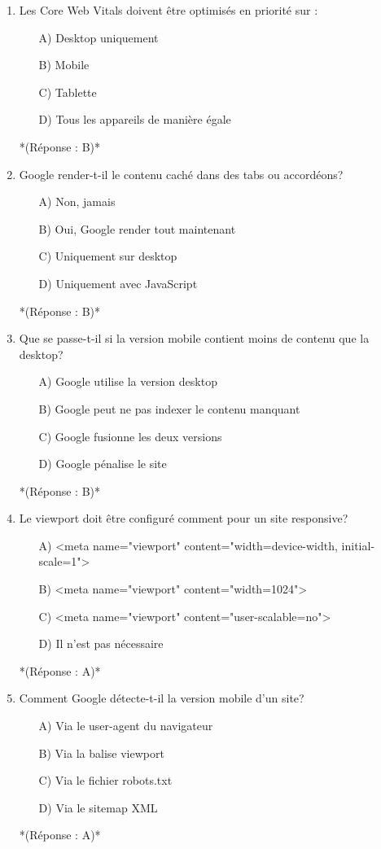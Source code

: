 \documentclass[12pt,a4paper,twoside]{report}
\begin{document}
\begin{enumerate}
\item Les Core Web Vitals doivent être optimisés en priorité sur :
\begin{itemize}
\item[A)] Desktop uniquement
\item[B)] Mobile
\item[C)] Tablette
\item[D)] Tous les appareils de manière égale
\end{itemize}
*(Réponse : B)*

\item Google render-t-il le contenu caché dans des tabs ou accordéons?
\begin{itemize}
\item[A)] Non, jamais
\item[B)] Oui, Google render tout maintenant
\item[C)] Uniquement sur desktop
\item[D)] Uniquement avec JavaScript
\end{itemize}
*(Réponse : B)*

\item Que se passe-t-il si la version mobile contient moins de contenu que la desktop?
\begin{itemize}
\item[A)] Google utilise la version desktop
\item[B)] Google peut ne pas indexer le contenu manquant
\item[C)] Google fusionne les deux versions
\item[D)] Google pénalise le site
\end{itemize}
*(Réponse : B)*

\item Le viewport doit être configuré comment pour un site responsive?
\begin{itemize}
\item[A)] <meta name="viewport" content="width=device-width, initial-scale=1">
\item[B)] <meta name="viewport" content="width=1024">
\item[C)] <meta name="viewport" content="user-scalable=no">
\item[D)] Il n'est pas nécessaire
\end{itemize}
*(Réponse : A)*

\item Comment Google détecte-t-il la version mobile d'un site?
\begin{itemize}
\item[A)] Via le user-agent du navigateur
\item[B)] Via la balise viewport
\item[C)] Via le fichier robots.txt
\item[D)] Via le sitemap XML
\end{itemize}
*(Réponse : A)*


\end{enumerate}
\end{document}
